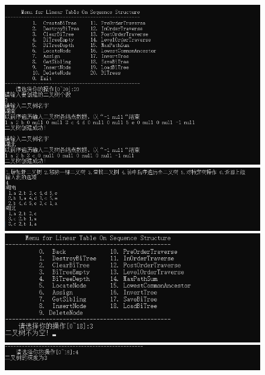 \documentclass[supercite]{Experimental_Report}
\theoremstyle{definition}
\begin{document}
\begin{sloppypar}
\begin{figure}[H]
    \centering
    \includegraphics[width=16cm]{pic3//1.png}
    \includegraphics[width=16cm]{pic3//2.png}
    \includegraphics[width=16cm]{pic3//3.png}
    \includegraphics[width=16cm]{pic3//4.png}
\end{figure} 


\end{sloppypar}
\end{document}
